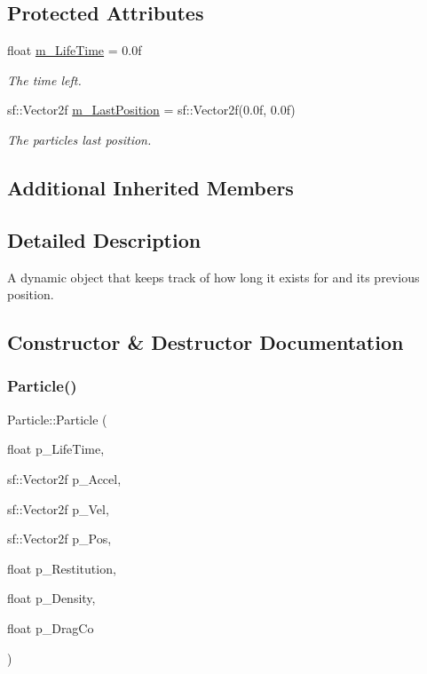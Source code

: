 \subsection*{Protected Attributes}
\begin{DoxyCompactItemize}
\item 
\mbox{\label{class_particle_a1b55980ef25543065a4565224d3cb8d2}} 
float \hyperlink{class_particle_a1b55980ef25543065a4565224d3cb8d2}{m\+\_\+\+Life\+Time} = 0.\+0f
\begin{DoxyCompactList}\small\item\em The time left. \end{DoxyCompactList}\item 
\mbox{\label{class_particle_a8d9af488a566382cc890e707212bd272}} 
sf\+::\+Vector2f \hyperlink{class_particle_a8d9af488a566382cc890e707212bd272}{m\+\_\+\+Last\+Position} = sf\+::\+Vector2f(0.\+0f, 0.\+0f)
\begin{DoxyCompactList}\small\item\em The particles last position. \end{DoxyCompactList}\end{DoxyCompactItemize}
\subsection*{Additional Inherited Members}


\subsection{Detailed Description}
A dynamic object that keeps track of how long it exists for and its previous position. 

\subsection{Constructor \& Destructor Documentation}
\mbox{\label{class_particle_ac4b406b1462a981e7a0e430b7592e049}} 
\subsubsection{\texorpdfstring{Particle()}{Particle()}}
{\footnotesize\ttfamily Particle\+::\+Particle (\begin{DoxyParamCaption}\item[{float}]{p\+\_\+\+Life\+Time,  }\item[{sf\+::\+Vector2f}]{p\+\_\+\+Accel,  }\item[{sf\+::\+Vector2f}]{p\+\_\+\+Vel,  }\item[{sf\+::\+Vector2f}]{p\+\_\+\+Pos,  }\item[{float}]{p\+\_\+\+Restitution,  }\item[{float}]{p\+\_\+\+Density,  }\item[{float}]{p\+\_\+\+Drag\+Co }\end{DoxyParamCaption})}

